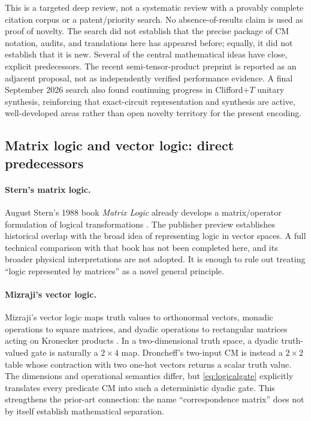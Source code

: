 This is a targeted deep review, not a systematic review with a provably complete citation corpus or a patent/priority search. No absence-of-results claim is used as proof of novelty. The search did not establish that the precise package of CM notation, audits, and translations here has appeared before; equally, it did not establish that it is new. Several of the central mathematical ideas have close, explicit predecessors. The recent semi-tensor-product preprint is reported as an adjacent proposal, not as independently verified performance evidence.  A final September 2026 search also found continuing progress in Clifford+$T$ unitary synthesis, reinforcing that exact-circuit representation and synthesis are active, well-developed areas rather than open novelty territory for the present encoding.

\subsection{Matrix logic and vector logic: direct predecessors}
\paragraph{Stern's matrix logic.}
August Stern's 1988 book \emph{Matrix Logic} already develops a matrix/operator formulation of logical transformations \cite{stern1988}. The publisher preview establishes historical overlap with the broad idea of representing logic in vector spaces. A full technical comparison with that book has not been completed here, and its broader physical interpretations are not adopted. It is enough to rule out treating ``logic represented by matrices'' as a novel general principle.

\paragraph{Mizraji's vector logic.}
Mizraji's vector logic maps truth values to orthonormal vectors, monadic operations to square matrices, and dyadic operations to rectangular matrices acting on Kronecker products \cite{mizraji2008}. In a two-dimensional truth space, a dyadic truth-valued gate is naturally a $2\times4$ map. Droncheff's two-input CM is instead a $2\times2$ table whose contraction with two one-hot vectors returns a scalar truth value. The dimensions and operational semantics differ, but \cref{eq:logicalgate} explicitly translates every predicate CM into such a deterministic dyadic gate. This strengthens the prior-art connection: the name ``correspondence matrix'' does not by itself establish mathematical separation.

